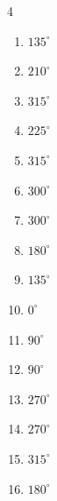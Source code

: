 \begin{multicols}{4}
\begin{enumerate}
  \item $\displaystyle 135^{\circ}$

  \item $\displaystyle 210^{\circ}$

  \item $\displaystyle 315^{\circ}$

  \item $\displaystyle 225^{\circ}$

  \item $\displaystyle 315^{\circ}$

  \item $\displaystyle 300^{\circ}$

  \item $\displaystyle 300^{\circ}$

  \item $\displaystyle 180^{\circ}$
        \phantom{$\displaystyle =\pi$}

  \item $\displaystyle 135^{\circ}$

  \item $\displaystyle 0^{\circ}$
        \phantom{$\displaystyle =0$}

  \item $\displaystyle 90^{\circ}$

  \item $\displaystyle 90^{\circ}$

  \item $\displaystyle 270^{\circ}$

  \item $\displaystyle 270^{\circ}$

  \item $\displaystyle 315^{\circ}$

  \item $\displaystyle 180^{\circ}$
        \phantom{$\displaystyle =\pi$}


\end{enumerate}
\end{multicols}
